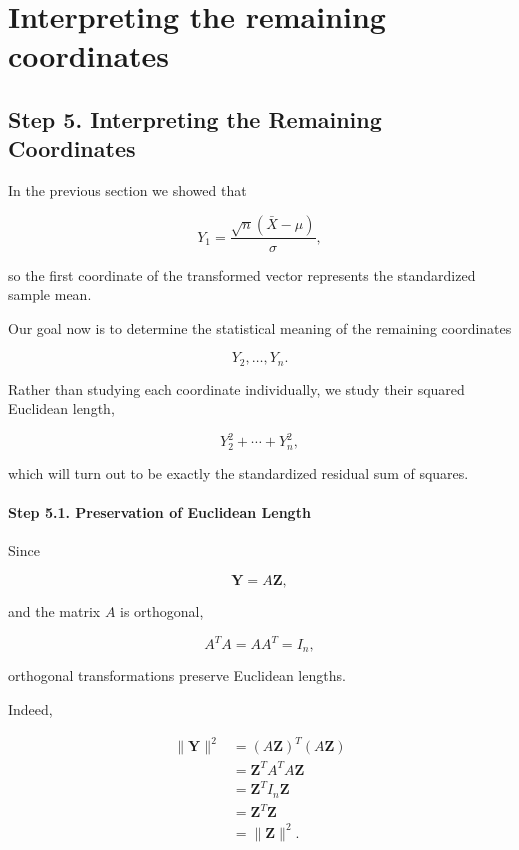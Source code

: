 \documentclass[11pt]{article}
\begin{document}
	\section{Interpreting the remaining coordinates}
	\begin{mdframed}[
		linewidth=0.8pt,
		roundcorner=6pt,
		backgroundcolor=gray!5,
		linecolor=gray!60,
		innertopmargin=10pt,
		innerbottommargin=10pt,
		innerleftmargin=10pt,
		innerrightmargin=10pt
		]
		
		\subsection*{Step 5. Interpreting the Remaining Coordinates}
		
		In the previous section we showed that
		
		\[
		Y_1
		=
		\frac{\sqrt n(\bar X-\mu)}{\sigma},
		\]
		
		so the first coordinate of the transformed vector represents the
		standardized sample mean.
		
		Our goal now is to determine the statistical meaning of the remaining
		coordinates
		
		\[
		Y_2,\ldots,Y_n.
		\]
		
		Rather than studying each coordinate individually, we study their squared
		Euclidean length,
		
		\[
		Y_2^2+\cdots+Y_n^2,
		\]
		
		which will turn out to be exactly the standardized residual sum of squares.
		
		\paragraph{Step 5.1. Preservation of Euclidean Length}
		
		Since
		
		\[
		\mathbf Y=A\mathbf Z,
		\]
		
		and the matrix $A$ is orthogonal,
		
		\[
		A^TA=AA^T=I_n,
		\]
		
		orthogonal transformations preserve Euclidean lengths.
		
		Indeed,
		
		\[
		\begin{aligned}
			\|\mathbf Y\|^2
			&=
			(A\mathbf Z)^T(A\mathbf Z)
			\\
			&=
			\mathbf Z^TA^TA\mathbf Z
			\\
			&=
			\mathbf Z^TI_n\mathbf Z
			\\
			&=
			\mathbf Z^T\mathbf Z
			\\
			&=
			\|\mathbf Z\|^2.
		\end{aligned}
		\]
		

\end{mdframed}
\end{document}
